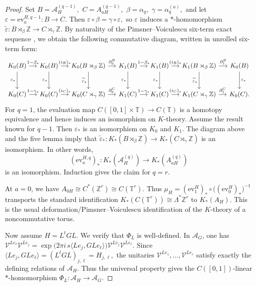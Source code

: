 \documentclass[11pt]{amsart}
\theoremstyle{definition}
\theoremstyle{remark}
\newcommand{\T}{\mathbb{T}}
\newcommand{\Z}{\mathbb{Z}}
\newcommand{\ev}{\mathrm{ev}}
\begin{document}
\begin{proof}
Set $B=\mathcal A_H^{(q-1)},$ $C=A_{aH}^{(q-1)},$
$\beta=\alpha_q,$ $\gamma=\alpha_q^{(a)},$
and let $\varepsilon=\ev_a^{H,q-1}\colon B\to C.$
Then $\varepsilon\circ\beta=\gamma\circ\varepsilon,$
so $\varepsilon$ induces a $*$-homomorphism $\widetilde{\varepsilon}\colon
B\rtimes_\beta\Z
\longrightarrow
C\rtimes_\gamma\Z.$
By naturality of the Pimsner--Voiculescu six-term exact sequence
\cite{PimsnerVoiculescu}, we obtain the following commutative diagram, written
in unrolled six-term form:
\[
\begin{tikzcd}[column sep=small, row sep=large]
K_0(B)
  \arrow[r,"1-\beta_*"]
  \arrow[d,"\varepsilon_*"']
&
K_0(B)
  \arrow[r,"(i_B)_*"]
  \arrow[d,"\varepsilon_*"']
&
K_0(B\rtimes_\beta\Z)
  \arrow[r,"\partial_0^B"]
  \arrow[d,"\widetilde{\varepsilon}_*"']
&
K_1(B)
  \arrow[r,"1-\beta_*"]
  \arrow[d,"\varepsilon_*"']
&
K_1(B)
  \arrow[r,"(i_B)_*"]
  \arrow[d,"\varepsilon_*"']
&
K_1(B\rtimes_\beta\Z)
  \arrow[r,"\partial_1^B"]
  \arrow[d,"\widetilde{\varepsilon}_*"']
&
K_0(B)
  \arrow[d,"\varepsilon_*"]
\\
K_0(C)
  \arrow[r,"1-\gamma_*"]
&
K_0(C)
  \arrow[r,"(i_C)_*"]
&
K_0(C\rtimes_\gamma\Z)
  \arrow[r,"\partial_0^C"]
&
K_1(C)
  \arrow[r,"1-\gamma_*"]
&
K_1(C)
  \arrow[r,"(i_C)_*"]
&
K_1(C\rtimes_\gamma\Z)
  \arrow[r,"\partial_1^C"]
&
K_0(C).
\end{tikzcd}
\]
For $q=1$, the evaluation map $C([0,1]\times\T)\longrightarrow C(\T)$
is a homotopy equivalence and hence induces an isomorphism on $K$-theory.
Assume the result known for $q-1$. Then $\varepsilon_*$ is an isomorphism
on $K_0$ and $K_1$. The diagram above and the five lemma imply that $\widetilde{\varepsilon}_*
\colon
K_*(B\rtimes_\beta\Z)
\longrightarrow
K_*(C\rtimes_\gamma\Z)$
is an isomorphism. In other words,
\[
(\ev_a^{H,q})_*
\colon
K_*(\mathcal A_H^{(q)})
\longrightarrow
K_*(A_{aH}^{(q)})
\]
is an isomorphism. Induction gives the claim for $q=r$.

At $a=0$, we have $A_{0H}\cong C^*(\Z^r)\cong C(\T^r)$.
Thus $\mu_H=(\ev_1^H)_*\circ\bigl((\ev_0^H)_*\bigr)^{-1}$
transports the standard identification $K_*(C(\T^r))\cong \Lambda^*\Z^r$
to $K_*(A_H)$. This is the usual deformation/Pimsner--Voiculescu
identification of the $K$-theory of a noncommutative torus.

Now assume $H=L^tGL$. We verify that $\Phi_L$ is well-defined. In
$\mathcal A_G$, one has $\mathcal V^{Le_\ell}\mathcal V^{Le_j}=
\exp\bigl(2\pi i\,s\langle Le_j,GLe_\ell\rangle\bigr)
\mathcal V^{Le_j}\mathcal V^{Le_\ell}.$
Since $\langle Le_j,GLe_\ell\rangle=(L^tGL)_{j,\ell}=H_{j,\ell},$
the unitaries $\mathcal V^{Le_1},\ldots,\mathcal V^{Le_r}$ satisfy exactly the
defining relations of $\mathcal A_H$. Thus the universal property gives the
$C([0,1])$-linear $*$-homomorphism $\Phi_L\colon \mathcal A_H\to \mathcal A_G.$


\end{proof}
\end{document}
